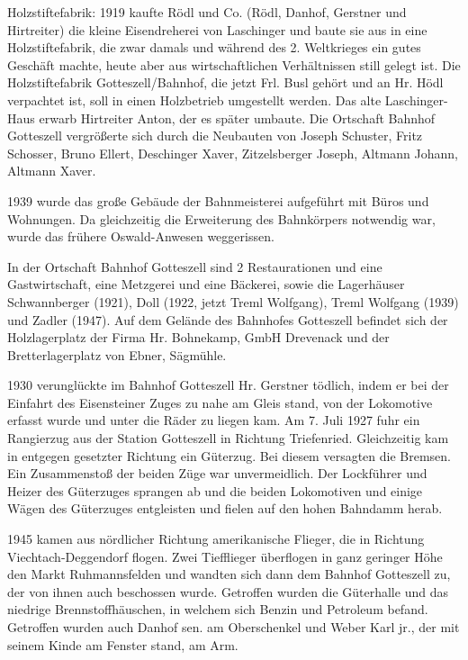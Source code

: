 \documentclass{book}
\begin{document}
Holzstiftefabrik: 1919 kaufte Rödl und Co. (Rödl, Danhof, Gerstner und
Hirtreiter) die kleine Eisendreherei von Laschinger und baute sie aus in eine
Holzstiftefabrik, die zwar damals und während des 2. Weltkrieges ein gutes
Geschäft machte, heute aber aus wirtschaftlichen Verhältnissen still gelegt ist.
Die Holzstiftefabrik Gotteszell/Bahnhof, die jetzt Frl. Busl gehört und an Hr.
Hödl verpachtet ist, soll in einen Holzbetrieb umgestellt werden. Das alte
Laschinger-Haus erwarb Hirtreiter Anton, der es später umbaute. Die Ortschaft
Bahnhof Gotteszell vergrößerte sich durch die Neubauten von Joseph Schuster,
Fritz Schosser, Bruno Ellert, Deschinger Xaver, Zitzelsberger Joseph, Altmann
Johann, Altmann Xaver.

1939 wurde das große Gebäude der Bahnmeisterei aufgeführt mit Büros und
Wohnungen. Da gleichzeitig die Erweiterung des Bahnkörpers notwendig war, wurde
das frühere Oswald-Anwesen weggerissen.

In der Ortschaft Bahnhof Gotteszell sind 2 Restaurationen und eine
Gastwirtschaft, eine Metzgerei und eine Bäckerei, sowie die Lagerhäuser
Schwannberger (1921), Doll (1922, jetzt Treml Wolfgang), Treml Wolfgang (1939)
und Zadler (1947). Auf dem Gelände des Bahnhofes Gotteszell befindet sich der
Holzlagerplatz der Firma Hr. Bohnekamp, GmbH Drevenack und der Bretterlagerplatz
von Ebner, Sägmühle.

1930 verunglückte im Bahnhof Gotteszell Hr. Gerstner tödlich, indem er bei der
Einfahrt des Eisensteiner Zuges zu nahe am Gleis stand, von der Lokomotive
erfasst wurde und unter die Räder zu liegen kam. Am 7. Juli 1927 fuhr ein
Rangierzug aus der Station Gotteszell in Richtung Triefenried. Gleichzeitig kam
in entgegen gesetzter Richtung ein Güterzug. Bei diesem versagten die Bremsen.
Ein Zusammenstoß der beiden Züge war unvermeidlich. Der Lockführer und Heizer
des Güterzuges sprangen ab und die beiden Lokomotiven und einige Wägen des
Güterzuges entgleisten und fielen auf den hohen Bahndamm herab.

1945 kamen aus nördlicher Richtung amerikanische Flieger, die in Richtung
Viechtach-Deggendorf flogen. Zwei Tiefflieger überflogen in ganz geringer Höhe
den Markt Ruhmannsfelden und wandten sich dann dem Bahnhof Gotteszell zu, der
von ihnen auch beschossen wurde. Getroffen wurden die Güterhalle und das
niedrige Brennstoffhäuschen, in welchem sich Benzin und Petroleum befand.
Getroffen wurden auch Danhof sen. am Oberschenkel und Weber Karl jr., der mit
seinem Kinde am Fenster stand, am Arm.
\end{document}
